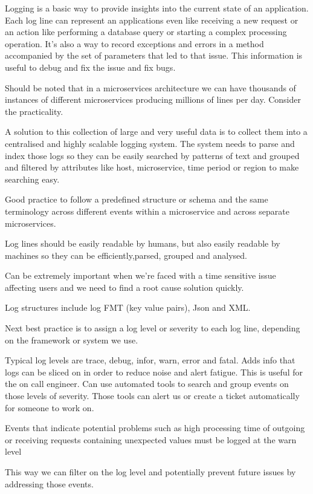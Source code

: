 Logging is a basic way to provide insights into the current state of an application.
Each log line can represent an applications even like receiving a new request or an action like performing a database query or starting a complex processing operation.
It's also a way to record exceptions and errors in a method accompanied by the set of parameters that led to that issue.
This information is useful to debug and fix the issue and fix bugs.

Should be noted that in a microservices architecture we can have thousands of instances of different microservices producing millions of lines per day.
Consider the practicality.

A solution to this collection of large and very useful data is to collect them into a centralised and highly scalable logging system.
The system needs to parse and index those logs so they can be easily searched by patterns of text and grouped and filtered by attributes like host, microservice, time period or region to make searching easy.

Good practice to follow a predefined structure or schema and the same terminology across different events within a microservice and across separate microservices.

Log lines should be easily readable by humans, but also easily readable by machines so they can be efficiently,parsed, grouped and analysed.

Can be extremely important when we're faced with a time sensitive issue affecting users and we need to find a root cause solution quickly.

Log structures include log FMT (key value pairs), Json and XML.

Next best practice is to assign a log level or severity to each log line, depending on the framework or system we use.

Typical log levels are trace, debug, infor, warn, error and fatal.
Adds info that logs can be sliced on in order to reduce noise and alert fatigue.
This is useful for the on call engineer.
Can use automated tools to search and group events on those levels of severity.
Those tools can alert us or create a ticket automatically for someone to work on.

Events that indicate potential problems such as high processing time of outgoing or receiving requests containing unexpected values must be logged at the warn level

This way we can filter on the log level and potentially prevent future issues by addressing those events.

